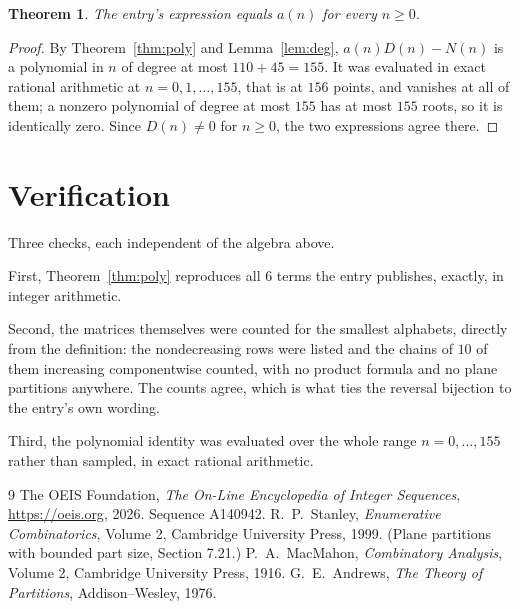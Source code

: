 \documentclass[11pt,a4paper]{article}
\theoremstyle{plain}
\newtheorem{theorem}{Theorem}
\theoremstyle{definition}
\begin{document}
\begin{theorem}
The entry's expression equals $a(n)$ for every $n\ge0$.
\end{theorem}

\begin{proof}
By Theorem~\ref{thm:poly} and Lemma~\ref{lem:deg}, $a(n)D(n)-N(n)$ is a polynomial in $n$
of degree at most $110+45=155$. It was evaluated in exact rational arithmetic at
$n=0,1,\dots,155$, that is at $156$ points, and vanishes at all of them; a nonzero polynomial
of degree at most $155$ has at most $155$ roots, so it is identically zero. Since $D(n)\neq0$
for $n\ge0$, the two expressions agree there.
\end{proof}

\section{Verification}

Three checks, each independent of the algebra above.

First, Theorem~\ref{thm:poly} reproduces all $6$ terms the entry publishes,
exactly, in integer arithmetic.

Second, the matrices themselves were counted for the smallest alphabets, directly from the
definition: the nondecreasing rows were listed and the chains of $10$ of them increasing
componentwise counted, with no product formula and no plane partitions anywhere. The counts
agree, which is what ties the reversal bijection to the entry's own wording.

Third, the polynomial identity was evaluated over the whole range $n=0,\dots,155$ rather than
sampled, in exact rational arithmetic.

\begin{thebibliography}{9}
 The OEIS Foundation, \emph{The On-Line Encyclopedia of Integer
Sequences}, \url{https://oeis.org}, 2026. Sequence A140942.
 R.~P.~Stanley, \emph{Enumerative Combinatorics}, Volume 2, Cambridge
University Press, 1999. (Plane partitions with bounded part size, Section 7.21.)
 P.~A.~MacMahon, \emph{Combinatory Analysis}, Volume 2, Cambridge
University Press, 1916.
 G.~E.~Andrews, \emph{The Theory of Partitions}, Addison--Wesley, 1976.
\end{thebibliography}
\end{document}
